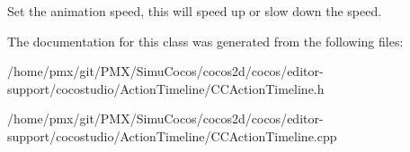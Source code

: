 Set the animation speed, this will speed up or slow down the speed. 

The documentation for this class was generated from the following files\+:\begin{DoxyCompactItemize}
\item 
/home/pmx/git/\+P\+M\+X/\+Simu\+Cocos/cocos2d/cocos/editor-\/support/cocostudio/\+Action\+Timeline/C\+C\+Action\+Timeline.\+h\item 
/home/pmx/git/\+P\+M\+X/\+Simu\+Cocos/cocos2d/cocos/editor-\/support/cocostudio/\+Action\+Timeline/C\+C\+Action\+Timeline.\+cpp\end{DoxyCompactItemize}
